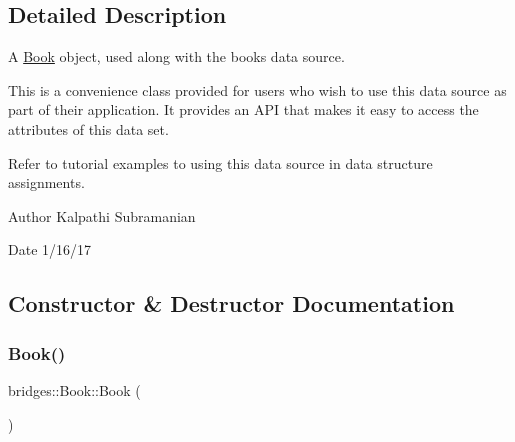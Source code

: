 \subsection{Detailed Description}
A \mbox{\hyperlink{classbridges_1_1_book}{Book}} object, used along with the books data source. 

This is a convenience class provided for users who wish to use this data source as part of their application. It provides an A\+PI that makes it easy to access the attributes of this data set.

Refer to tutorial examples to using this data source in data structure assignments.

\begin{DoxyAuthor}{Author}
Kalpathi Subramanian 
\end{DoxyAuthor}
\begin{DoxyDate}{Date}
1/16/17 
\end{DoxyDate}


\subsection{Constructor \& Destructor Documentation}
\mbox{\label{classbridges_1_1_book_abb2903c640bd263a2e077d52e12a773e}} 
\subsubsection{\texorpdfstring{Book()}{Book()}\hspace{0.1cm}{\footnotesize\ttfamily [1/2]}}
{\footnotesize\ttfamily bridges\+::\+Book\+::\+Book (\begin{DoxyParamCaption}{ }\end{DoxyParamCaption})\hspace{0.3cm}{\ttfamily [inline]}}

\mbox{\label{classbridges_1_1_book_ac3060f3eaf757c82ea21f6501eb97b80}} 
